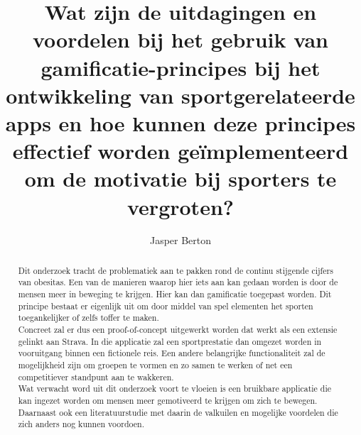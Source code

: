 \documentclass{hogent-article}
\title{Wat zijn de uitdagingen en voordelen bij het gebruik van gamificatie-principes bij het ontwikkeling van sportgerelateerde apps en hoe kunnen deze principes effectief worden geïmplementeerd om de motivatie bij sporters te vergroten?}
\author{Jasper Berton}
\begin{document}
\begin{abstract}
    
   Dit onderzoek tracht de problematiek aan te pakken rond de continu stijgende cijfers van obesitas. Een van de manieren waarop hier iets aan kan gedaan worden is door de mensen meer in beweging te krijgen. Hier kan dan gamificatie toegepast worden. Dit principe bestaat er eigenlijk uit om door middel van spel elementen het sporten toegankelijker of zelfs toffer te maken.
    \\
    
   Concreet zal er dus een proof-of-concept uitgewerkt worden dat werkt als een extensie gelinkt aan Strava. In die applicatie zal een sportprestatie dan omgezet worden in vooruitgang binnen een fictionele reis. Een andere belangrijke functionaliteit zal de mogelijkheid zijn om groepen te vormen en zo samen te werken of net een competitiever standpunt aan te wakkeren. \\
   
   Wat verwacht word uit dit onderzoek voort te vloeien is een bruikbare applicatie die kan ingezet worden om mensen meer gemotiveerd te krijgen om zich te bewegen. Daarnaast ook een literatuurstudie met daarin de valkuilen en mogelijke voordelen die zich anders nog kunnen voordoen. 
 
\end{abstract}

\tableofcontents



\printbibliography[heading=bibintoc]
\end{document}
